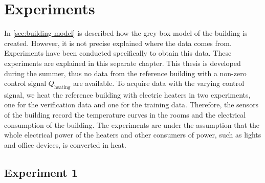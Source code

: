 \chapter{Experiments}
\label{ch:experiments}
In \autoref{sec:building model} is described how the grey-box model of the building is created. However, it is not precise explained where the data comes from. Experiments have been conducted specifically to obtain this data. These experiments are explained in this separate chapter. \newline
This thesis is developed during the summer, thus no data from the reference building with a non-zero control signal $\dot{Q}_\text{heating}$ are available. To acquire data with the varying control signal, we heat the reference building with electric heaters in two experiments, one for the verification data and one for the training data. Therefore, the sensors of the building record the temperature curves in the rooms and the electrical consumption of the building. The experiments are under the assumption that the whole electrical power of the heaters and other consumers of power, such as lights and office devices, is converted in heat.

\section{Experiment 1}
\label{sec:Experiment1}

